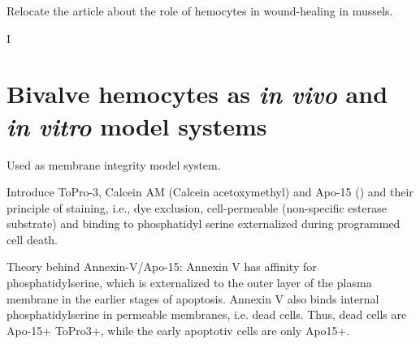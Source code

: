 Relocate the article about the role of hemocytes in wound-healing in mussels.

I

\section{Bivalve hemocytes as \emph{in vivo} and \emph{in vitro} model systems}
Used as membrane integrity model system.

Introduce ToPro-3, Calcein AM (Calcein acetoxymethyl) and Apo-15 (\cite{Barth2020}) and their principle of staining, i.e., dye exclusion, cell-permeable (non-specific esterase substrate) and binding to phosphatidyl serine externalized during programmed cell death.

Theory behind Annexin-V/Apo-15: Annexin V
has affinity for phosphatidylserine, which is externalized to the
outer layer of the plasma membrane in the earlier stages of apoptosis. Annexin V also binds internal phosphatidylserine in permeable membranes, i.e. dead cells. Thus, dead cells are Apo-15+ ToPro3+, while the early apoptotiv cells are only Apo15+.